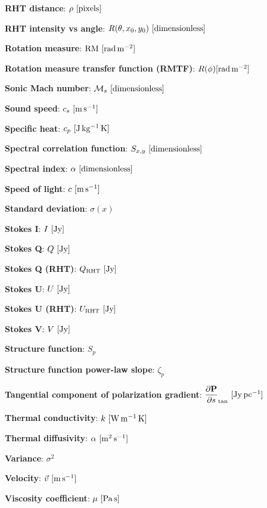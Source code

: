 \documentclass[a4paper,10pt]{article}
\begin{document}
{\noindent}\textbf{RHT distance}: $\rho~[{\rm pixels}]$

{\noindent}\textbf{RHT intensity vs angle}: $R(\theta,x_0,y_0)~[{\rm dimensionless}]$

{\noindent}\textbf{Rotation measure}: ${\rm RM~[rad\,m^{-2}]}$

{\noindent}\textbf{Rotation measure transfer function (RMTF)}: $R(\phi) {\rm [rad\,m^{-2}]}$

{\noindent}\textbf{Sonic Mach number}: $\mathcal{M}_s~[{\rm dimensionless]}$

{\noindent}\textbf{Sound speed}: $c_s ~ [{\rm m\,s^{-1}}]$

{\noindent}\textbf{Specific heat}: $c_p ~ [{\rm J\,kg^{-1}\,K}]$

{\noindent}\textbf{Spectral correlation function}: $S_{x,y}~[\rm{dimensionless}]$

{\noindent}\textbf{Spectral index}: $\alpha~[\rm{dimensionless}]$

{\noindent}\textbf{Speed of light}: $c~[\rm{m\,s^{-1}}]$

{\noindent}\textbf{Standard deviation}: $\sigma(x)$

{\noindent}\textbf{Stokes I}: $I ~ [\rm Jy]$

{\noindent}\textbf{Stokes Q}: $Q ~ [\rm Jy]$

{\noindent}\textbf{Stokes Q (RHT)}: $Q_\mathrm{RHT} ~ [\rm Jy]$

{\noindent}\textbf{Stokes U}: $U ~ [\rm Jy]$

{\noindent}\textbf{Stokes U (RHT)}: $U_\mathrm{RHT} ~ [\rm Jy]$

{\noindent}\textbf{Stokes V}: $V ~ [\rm Jy]$

{\noindent}\textbf{Structure function}: $S_p$

{\noindent}\textbf{Structure function power-law slope}: $\zeta_p$

{\noindent}\textbf{Tangential component of polarization gradient}: $\dfrac{\partial\mathbf{P}}{\partial s}_\mathrm{tan} ~ [{\rm Jy\,pc^{-1}}]$

{\noindent}\textbf{Thermal conductivity}: $k ~ [{\rm W\,m^{-1}\,K}]$

{\noindent}\textbf{Thermal diffusivity}: $\alpha ~ [{\rm m^2\,s^{-1}}]$

{\noindent}\textbf{Variance}: $\sigma^2$

{\noindent}\textbf{Velocity}: $\vec{v} ~ [{\rm m\,s^{-1}}]$

{\noindent}\textbf{Viscosity coefficient}: $\mu ~ [{\rm Pa\,s}]$
\end{document}
